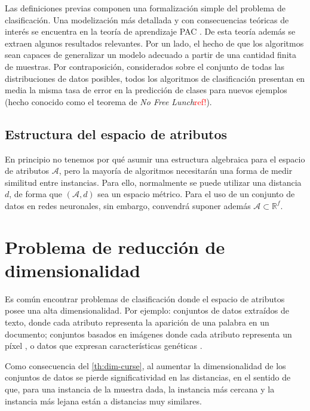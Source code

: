 Las definiciones previas componen una formalización simple del problema
de clasificación. Una modelización más detallada y con consecuencias
teóricas de interés se encuentra en la teoría de aprendizaje PAC
\autocite{shwartz2014}. De esta teoría además se extraen algunos resultados
relevantes. Por un lado, el hecho de que los algoritmos sean capaces de generalizar
un modelo adecuado a partir de una cantidad finita de muestras. Por contraposición,
considerados sobre el conjunto de todas las distribuciones de datos
posibles, todos los algoritmos de clasificación presentan en media la
misma tasa de error en la predicción de clases para nuevos ejemplos
(hecho conocido como el teorema de \textit{No Free Lunch}\textcolor{red}{ref!}).


\subsection{Estructura del espacio de
atributos}\label{estructura-del-espacio-de-atributos}

En principio no tenemos por qué asumir una estructura algebraica para el
espacio de atributos \(\mathcal A\), pero la mayoría de algoritmos
necesitarán una forma de medir similitud entre instancias. Para ello,
normalmente se puede utilizar una distancia \(d\), de forma que
\((\mathcal A,d)\) sea un espacio métrico. Para el uso de un conjunto de
datos en redes neuronales, sin embargo, convendrá suponer además
\(\mathcal A\subset \mathbb R^f\).

\section{Problema de reducción de
dimensionalidad}\label{sec:red-dim}

Es común encontrar problemas de clasificación donde el espacio de
atributos posee una alta dimensionalidad. Por ejemplo: conjuntos de
datos extraídos de texto, donde cada atributo representa la aparición de
una palabra en un documento; conjuntos basados en imágenes donde cada
atributo representa un píxel \autocite{mnist}, o datos que
expresan características genéticas \autocite{clarke2008}.

Como consecuencia del \autoref{th:dim-curse}, al aumentar la dimensionalidad de los conjuntos de datos se pierde significatividad en las distancias, en el sentido de que, para una instancia de la muestra dada, la instancia más cercana y la instancia más lejana están a distancias muy similares.

